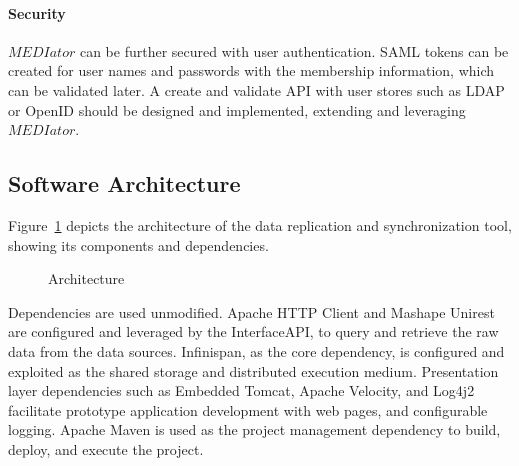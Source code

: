 \documentclass[conference]{IEEEtran}
\begin{document}
\paragraph*{Security}
$MEDIator$ can be further secured with user authentication. SAML tokens can be created for user names and passwords with the membership information, which can be validated later. A create and validate API with user stores such as LDAP or OpenID should be designed and implemented, extending and leveraging $MEDIator$.

\subsection{Software Architecture}
Figure~\ref{fig:arch} depicts the architecture of the data replication and synchronization tool, showing its components and dependencies.
\begin{figure}[!htbp]
\begin{center}
\end{center}
 \caption{Architecture}
 \label{fig:arch}
\end{figure}

Dependencies are used unmodified. Apache HTTP Client and Mashape Unirest are configured and leveraged by the InterfaceAPI, to query and retrieve the raw data from the data sources. Infinispan, as the core dependency, is configured and exploited as the shared storage and distributed execution medium. Presentation layer dependencies such as Embedded Tomcat, Apache Velocity, and Log4j2 facilitate prototype application development with web pages, and configurable logging. Apache Maven is used as the project management dependency to build, deploy, and execute the project.
\end{document}
